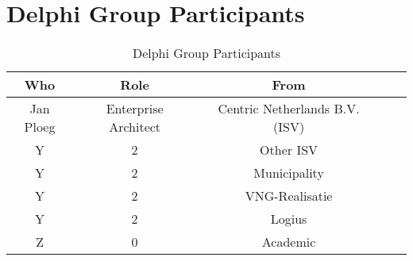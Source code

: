 \chapter{Delphi Group Participants}
\label{app:delphigroupparticipants}

\begin{table}[!h]
	\begin{center}
		\begin{tabular}{@{}ccccc@{}}
			\toprule
			\textbf{Who} & \textbf{Role} & \textbf{From} \\ \midrule
			Jan Ploeg & Enterprise Architect & Centric Netherlands B.V. (ISV) \\
			Y    & 2    & Other ISV \\
			Y    & 2    & Municipality \\
			Y    & 2    & VNG-Realisatie \\
			Y    & 2    & Logius \\
			Z    & 0    & Academic \\ \bottomrule
		\end{tabular}
		\caption{Delphi Group Participants}
		\label{tab:delphigroupparticipants}
	\end{center}
\end{table}